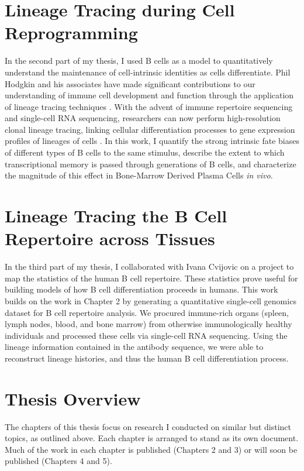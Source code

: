 \section{Lineage Tracing during Cell Reprogramming}
In the second part of my thesis, I used B cells as a model to quantitatively understand the maintenance of cell-intrinsic identities as cells differentiate. Phil Hodgkin and his associates have made significant contributions to our understanding of immune cell development and function through the application of lineage tracing techniques \cite{hodgkin2012cell, marchingo2014t}. With the advent of immune repertoire sequencing and single-cell RNA sequencing, researchers can now perform high-resolution clonal lineage tracing, linking cellular differentiation processes to gene expression profiles of lineages of cells \cite{stubbington2017t, horns2020memory}. In this work, I quantify the strong intrinsic fate biases of different types of B cells to the same stimulus, describe the extent to which transcriptional memory is passed through generations of B cells, and characterize the magnitude of this effect in Bone-Marrow Derived Plasma Cells \textit{in vivo}.

\section{Lineage Tracing the B Cell Repertoire across Tissues}
In the third part of my thesis, I collaborated with Ivana Cvijovic on a project to map the statistics of the human B cell repertoire. These statistics prove useful for building models of how B cell differentiation proceeds in humans. This work builds on the work in Chapter 2 by generating a quantitative single-cell genomics dataset for B cell repertoire analysis. We procured immune-rich organs (spleen, lymph nodes, blood, and bone marrow) from otherwise immunologically healthy individuals and processed these cells via single-cell RNA sequencing. Using the lineage information contained in the antibody sequence, we were able to reconstruct lineage histories, and thus the human B cell differentiation process.

\section{Thesis Overview}
The chapters of this thesis focus on research I conducted on similar but distinct topics, as outlined above. Each chapter is arranged to stand as its own document. Much of the work in each chapter is published (Chapters 2 and 3) or will soon be published (Chapters 4 and 5).